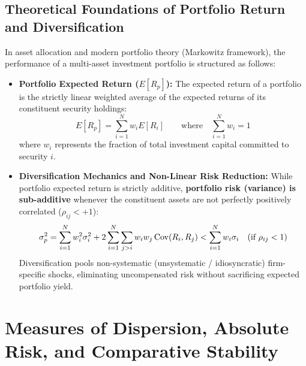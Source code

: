 \subsection{Theoretical Foundations of Portfolio Return and Diversification}
In asset allocation and modern portfolio theory (Markowitz framework), the performance of a multi-asset investment portfolio is structured as follows:
\begin{itemize}[leftmargin=*, topsep=2pt, itemsep=3pt]
    \item \textbf{Portfolio Expected Return ($E[R_p]$):}
    The expected return of a portfolio is the strictly linear weighted average of the expected returns of its constituent security holdings:
    \begin{equation}
        E[R_p] = \sum_{i=1}^{N} w_i E[R_i] \qquad \text{where} \quad \sum_{i=1}^{N} w_i = 1
    \end{equation}
    where $w_i$ represents the fraction of total investment capital committed to security $i$.

    \item \textbf{Diversification Mechanics and Non-Linear Risk Reduction:}
    While portfolio expected return is strictly additive, \textbf{portfolio risk (variance) is sub-additive} whenever the constituent assets are not perfectly positively correlated ($\rho_{ij} < +1$):
    \begin{equation}
        \sigma_p^2 = \sum_{i=1}^{N} w_i^2 \sigma_i^2 + 2\sum_{i=1}^{N}\sum_{j > i} w_i w_j \operatorname{Cov}(R_i, R_j) < \sum_{i=1}^{N} w_i \sigma_i \quad (\text{if } \rho_{ij} < 1)
    \end{equation}
    Diversification pools non-systematic (unsystematic / idiosyncratic) firm-specific shocks, eliminating uncompensated risk without sacrificing expected portfolio yield.
\end{itemize}

\newpage
\section{Measures of Dispersion, Absolute Risk, and Comparative Stability}

